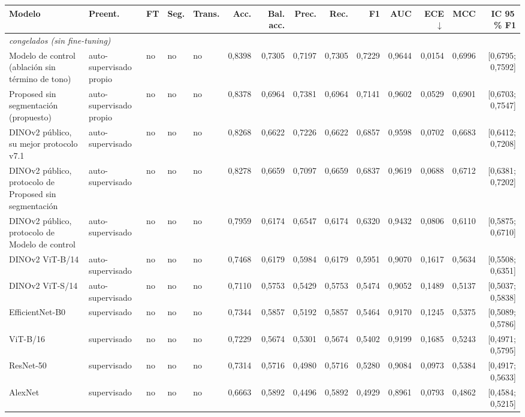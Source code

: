 \begin{table}[ht]
\centering
\scriptsize
\setlength{\tabcolsep}{3pt}
\begin{tabular}{@{}lllllrrrrrrrrr@{}}
\toprule
Modelo & Preent. & FT & Seg. & Trans. & Acc. & Bal. acc. & Prec. & Rec. & F1 & AUC & ECE$\downarrow$ & MCC & IC 95\,\% F1 \\
\midrule
\multicolumn{14}{l}{\textit{congelados (sin fine-tuning)}} \\
\midrule
Modelo de control (ablación sin término de tono) & auto-supervisado propio & no & no & no & 0,8398 & 0,7305 & 0,7197 & 0,7305 & 0,7229 & 0,9644 & 0,0154 & 0,6996 & [0,6795; 0,7592] \\
Proposed sin segmentación (propuesto) & auto-supervisado propio & no & no & no & 0,8378 & 0,6964 & 0,7381 & 0,6964 & 0,7141 & 0,9602 & 0,0529 & 0,6901 & [0,6703; 0,7547] \\
DINOv2 público, su mejor protocolo v7.1 & auto-supervisado & no & no & no & 0,8268 & 0,6622 & 0,7226 & 0,6622 & 0,6857 & 0,9598 & 0,0702 & 0,6683 & [0,6412; 0,7208] \\
DINOv2 público, protocolo de Proposed sin segmentación & auto-supervisado & no & no & no & 0,8278 & 0,6659 & 0,7097 & 0,6659 & 0,6837 & 0,9619 & 0,0688 & 0,6712 & [0,6381; 0,7202] \\
DINOv2 público, protocolo de Modelo de control & auto-supervisado & no & no & no & 0,7959 & 0,6174 & 0,6547 & 0,6174 & 0,6320 & 0,9432 & 0,0806 & 0,6110 & [0,5875; 0,6710] \\
DINOv2 ViT-B/14 & auto-supervisado & no & no & no & 0,7468 & 0,6179 & 0,5984 & 0,6179 & 0,5951 & 0,9070 & 0,1617 & 0,5634 & [0,5508; 0,6351] \\
DINOv2 ViT-S/14 & auto-supervisado & no & no & no & 0,7110 & 0,5753 & 0,5429 & 0,5753 & 0,5474 & 0,9052 & 0,1489 & 0,5137 & [0,5037; 0,5838] \\
EfficientNet-B0 & supervisado & no & no & no & 0,7344 & 0,5857 & 0,5192 & 0,5857 & 0,5464 & 0,9170 & 0,1245 & 0,5375 & [0,5089; 0,5786] \\
ViT-B/16 & supervisado & no & no & no & 0,7229 & 0,5674 & 0,5301 & 0,5674 & 0,5402 & 0,9199 & 0,1685 & 0,5243 & [0,4971; 0,5795] \\
ResNet-50 & supervisado & no & no & no & 0,7314 & 0,5716 & 0,4980 & 0,5716 & 0,5280 & 0,9084 & 0,0973 & 0,5384 & [0,4917; 0,5633] \\
AlexNet & supervisado & no & no & no & 0,6663 & 0,5892 & 0,4496 & 0,5892 & 0,4929 & 0,8961 & 0,0793 & 0,4862 & [0,4584; 0,5215] \\

\end{tabular}
\end{table}
